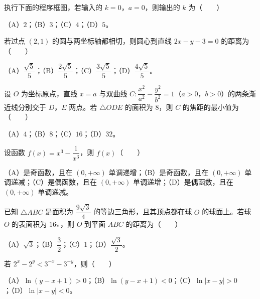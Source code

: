 \begin{question}
执行下面的程序框图，若输入的 $k=0$，$a=0$，则输出的 $k$ 为\mbox{（　　）}

（A）$2$；（B）$3$；（C）$4$；（D）$5$。
\nopagebreak[4]
\begin{center}\end{center}
\nopagebreak[4]
\end{question}
\begin{question}
若过点 $(2,1)$ 的圆与两坐标轴都相切，则圆心到直线 $2x-y-3=0$ 的距离为\mbox{（　　）}

（A）$\dfrac{\sqrt5}5$；（B）$\dfrac{2\sqrt5}5$；（C）$\dfrac{3\sqrt5}5$；（D）$\dfrac{4\sqrt5}5$。

\end{question}
\begin{question}
设 $O$ 为坐标原点，直线 $x=a$ 与双曲线 $C:\dfrac{x^2}{a^2}-\dfrac{y^2}{b^2}=1$（$a>0$，$b>0$）的两条渐近线分别交于 $D$，$E$ 两点。若 $\triangle ODE$ 的面积为 $8$，则 $C$ 的焦距的最小值为\mbox{（　　）}

（A）$4$；（B）$8$；（C）$16$；（D）$32$。

\end{question}
\begin{question}
设函数 $f(x)=x^3-\dfrac1{x^3}$，则 $f(x)$\mbox{（　　）}

（A）是奇函数，且在 $(0,+\infty)$ 单调递增；（B）是奇函数，且在 $(0,+\infty)$ 单调递减；（C）是偶函数，且在 $(0,+\infty)$ 单调递增；（D）是偶函数，且在 $(0,+\infty)$ 单调递减。

\end{question}
\begin{question}
已知 $\triangle ABC$ 是面积为 $\dfrac{9\sqrt3}4$ 的等边三角形，且其顶点都在球 $O$ 的球面上。若球 $O$ 的表面积为 $16\pi$，则 $O$ 到平面 $ABC$ 的距离为\mbox{（　　）}

（A）$\sqrt3$；（B）$\dfrac32$；（C）$1$；（D）$\dfrac{\sqrt3}2$。

\end{question}
\begin{question}
若 $2^x-2^y<3^{-x}-3^{-y}$，则\mbox{（　　）}

（A）$\ln(y-x+1)>0$；（B）$\ln(y-x+1)<0$；（C）$\ln|x-y|>0$；（D）$\ln|x-y|<0$。

\end{question}

